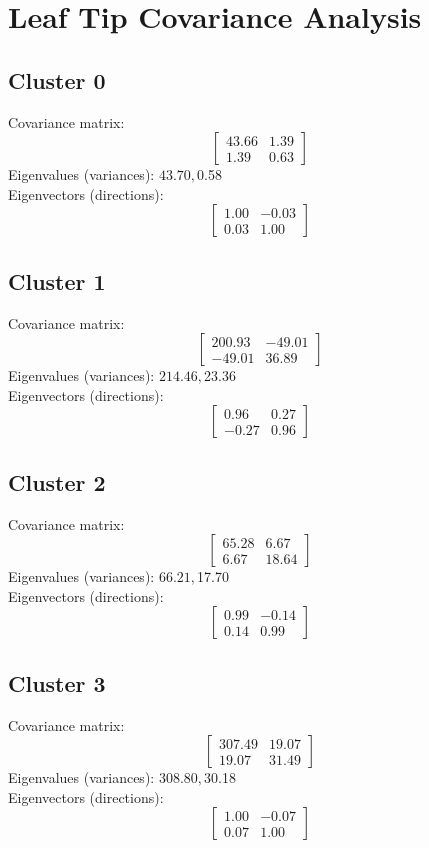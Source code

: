 \documentclass{article}
\begin{document}
\section*{Leaf Tip Covariance Analysis}
\subsection*{Cluster 0}
Covariance matrix:
\[\begin{bmatrix}43.66 & 1.39 \\1.39 & 0.63\end{bmatrix}\]
Eigenvalues (variances): $ 43.70, $0.58\\
Eigenvectors (directions):
\[\begin{bmatrix}1.00 & -0.03 \\0.03 & 1.00\end{bmatrix}\]
\subsection*{Cluster 1}
Covariance matrix:
\[\begin{bmatrix}200.93 & -49.01 \\-49.01 & 36.89\end{bmatrix}\]
Eigenvalues (variances): $ 214.46, $23.36\\
Eigenvectors (directions):
\[\begin{bmatrix}0.96 & 0.27 \\-0.27 & 0.96\end{bmatrix}\]
\subsection*{Cluster 2}
Covariance matrix:
\[\begin{bmatrix}65.28 & 6.67 \\6.67 & 18.64\end{bmatrix}\]
Eigenvalues (variances): $ 66.21, $17.70\\
Eigenvectors (directions):
\[\begin{bmatrix}0.99 & -0.14 \\0.14 & 0.99\end{bmatrix}\]
\subsection*{Cluster 3}
Covariance matrix:
\[\begin{bmatrix}307.49 & 19.07 \\19.07 & 31.49\end{bmatrix}\]
Eigenvalues (variances): $ 308.80, $30.18\\
Eigenvectors (directions):
\[\begin{bmatrix}1.00 & -0.07 \\0.07 & 1.00\end{bmatrix}\]
\end{document}
